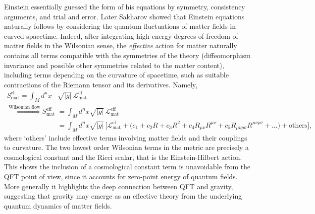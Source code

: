 \begin{mytheorem}
%
Einstein essentially guessed the form of his equations by symmetry, consistency arguments, and trial and error.
Later Sakharov showed that Einstein equations naturally follows by considering the quantum fluctuations of matter fields in curved spacetime.
%
Indeed, after integrating high-energy degrees of freedom of matter fields in the Wilsonian sense, the \emph{effective} action for matter naturally contains all terms compatible with the symmetries of the theory (diffeomorphism invariance and possible other symmetries related to the matter content), including terms depending on the curvature of spacetime, such as suitable contractions of the Riemann tensor and its derivatives.
Namely,
{\small
\begin{align}
    S_{\mathrm{mat}}^{\mathrm{cl}}= \int_M\!\!d^nx&\sqrt{|g|}\,\mathcal{L}_{\mathrm{mat}}^{\mathrm{cl}}
    \\
        \overset{\text{Wilsonian flow}}{\Longrightarrow}
    S_{\mathrm{mat}}^{\mathrm{eff}}&= \int_M\!\!d^nx\sqrt{|g|}\,\mathcal{L}_{\mathrm{mat}}^{\mathrm{eff}}
    \\
    &= \int_M\!\!d^nx\sqrt{|g|}\,\bigg[\mathcal{L}_{\mathrm{mat}}^{\mathrm{cl}} + \Big( c_1 + c_2 R + c_3 R^2 + c_4 R_{\mu\nu}R^{\mu\nu} + c_5 R_{\mu\nu\rho\sigma}R^{\mu\nu\rho\sigma} + \ldots \Big) + \text{others}\bigg],
\end{align}
}
where `others' include effective terms involving matter fields and their couplings to curvature.
%
The two lowest order Wilsonian terms in the metric are precisely a cosmological constant and the Ricci scalar, that is the Einstein-Hilbert action.
This shows the inclusion of a cosmological constant term is unavoidable from the QFT point of view, since it accounts for zero-point energy of quantum fields.
More generally it highlights the deep connection between QFT and gravity, suggesting that gravity may emerge as an effective theory from the underlying quantum dynamics of matter fields.


\end{mytheorem}
